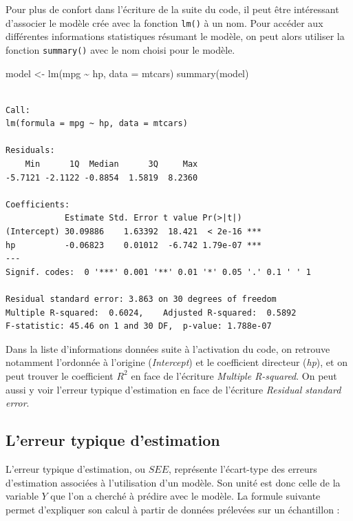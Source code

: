 \documentclass[
  letterpaper,
]{book}
\newenvironment{Shaded}{\begin{snugshade}}{\end{snugshade}}
\newcommand{\AttributeTok}[1]{\textcolor[rgb]{0.40,0.45,0.13}{#1}}
\newcommand{\FunctionTok}[1]{\textcolor[rgb]{0.28,0.35,0.67}{#1}}
\newcommand{\NormalTok}[1]{\textcolor[rgb]{0.00,0.23,0.31}{#1}}
\newcommand{\OtherTok}[1]{\textcolor[rgb]{0.00,0.23,0.31}{#1}}
\newcommand{\SpecialCharTok}[1]{\textcolor[rgb]{0.37,0.37,0.37}{#1}}
\begin{document}
Pour plus de confort dans l'écriture de la suite du code, il peut être
intéressant d'associer le modèle crée avec la fonction \texttt{lm()} à
un nom. Pour accéder aux différentes informations statistiques résumant
le modèle, on peut alors utiliser la fonction \texttt{summary()} avec le
nom choisi pour le modèle.

\begin{Shaded}
\begin{Highlighting}[]
\NormalTok{model }\OtherTok{\textless{}{-}} \FunctionTok{lm}\NormalTok{(mpg }\SpecialCharTok{\textasciitilde{}}\NormalTok{ hp, }\AttributeTok{data =}\NormalTok{ mtcars)}
\FunctionTok{summary}\NormalTok{(model)}
\end{Highlighting}
\end{Shaded}

\begin{verbatim}

Call:
lm(formula = mpg ~ hp, data = mtcars)

Residuals:
    Min      1Q  Median      3Q     Max 
-5.7121 -2.1122 -0.8854  1.5819  8.2360 

Coefficients:
            Estimate Std. Error t value Pr(>|t|)    
(Intercept) 30.09886    1.63392  18.421  < 2e-16 ***
hp          -0.06823    0.01012  -6.742 1.79e-07 ***
---
Signif. codes:  0 '***' 0.001 '**' 0.01 '*' 0.05 '.' 0.1 ' ' 1

Residual standard error: 3.863 on 30 degrees of freedom
Multiple R-squared:  0.6024,    Adjusted R-squared:  0.5892 
F-statistic: 45.46 on 1 and 30 DF,  p-value: 1.788e-07
\end{verbatim}

Dans la liste d'informations données suite à l'activation du code, on
retrouve notamment l'ordonnée à l'origine (\emph{Intercept}) et le
coefficient directeur (\emph{hp}), et on peut trouver le coefficient
\(R^2\) en face de l'écriture \emph{Multiple R-squared}. On peut aussi y
voir l'erreur typique d'estimation en face de l'écriture \emph{Residual
standard error}.

\subsection{L'erreur typique
d'estimation}\label{lerreur-typique-destimation}

L'erreur typique d'estimation, ou \(SEE\), représente l'écart-type des
erreurs d'estimation associées à l'utilisation d'un modèle. Son unité
est donc celle de la variable \(Y\) que l'on a cherché à prédire avec le
modèle. La formule suivante permet d'expliquer son calcul à partir de
données prélevées sur un échantillon :
\end{document}

